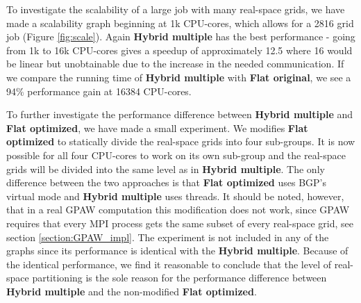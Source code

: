 \documentclass[conference]{IEEEtran}
\begin{document}
To investigate the scalability of a large job with many real-space grids, we have made a scalability graph beginning at 1k CPU-cores, which allows for a 2816 grid job (Figure \ref{fig:scale}). Again \textbf{Hybrid multiple} has the best performance - going from 1k to 16k CPU-cores gives a speedup of approximately 12.5 where 16 would be linear but unobtainable due to the increase in the needed communication. If we compare the running time of \textbf{Hybrid multiple} with \textbf{Flat original}, we see a 94\% performance gain at 16384 CPU-cores.


To further investigate the performance difference between \textbf{Hybrid multiple} and \textbf{Flat optimized}, we have made a small experiment. We modifies \textbf{Flat optimized} to statically divide the real-space grids into four sub-groups. It is now possible for all four CPU-cores to work on its own sub-group and the real-space grids will be divided into the same level as in \textbf{Hybrid multiple}. The only difference between the two approaches is that \textbf{Flat optimized} uses BGP's virtual mode and \textbf{Hybrid multiple} uses threads.
It should be noted, however, that in a real GPAW computation this modification does not work, since GPAW requires that every MPI process gets the same subset of every real-space grid, see section \ref{section:GPAW_impl}.
The experiment is not included in any of the graphs since its performance is identical with the \textbf{Hybrid multiple}. Because of the identical performance, we find it reasonable to conclude that the level of real-space partitioning is the sole reason for the performance difference between \textbf{Hybrid multiple} and the non-modified \textbf{Flat optimized}.
\end{document}
